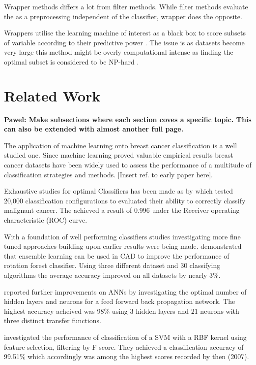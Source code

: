 Wrapper methods differs a lot from filter methods. While filter methods evaluate the as a preprocessing independent of the classifier, wrapper does the opposite.

Wrappers utilise the learning machine of interest as a black box to score subsets of variable according to their predictive power \parencite{guyon2003}. The issue is as datasets become very large this method might be overly computational intense as finding the optimal subset is considered to be NP-hard \parencite{amaldi1998}.


\section{Related Work}

\textbf{ Pawel: Make subsections where each section coves a specific topic. This can also be extended with almost another full page.}

The application of machine learning onto breast cancer classification is a well studied one. Since machine learning proved valuable empirical results breast cancer datasets have been widely used to assess the performance of a multitude of classification strategies and methods. [Insert ref. to early paper here].

Exhaustive studies for optimal Classifiers has been made as by \parencite{ramos2012} which tested 20,000 classification configurations to evaluated their ability to correctly classify malignant cancer. The achieved a result of 0.996 under the Receiver operating characteristic (ROC) curve.

With a foundation of well performing classifiers studies investigating more fine tuned approaches building upon earlier results were being made. \textcite{akin2011} demonstrated that ensemble learning can be used in CAD to improve the performance of rotation forest classifier. Using three different dataset and 30 classifying algorithms the average accuracy improved on all datasets by nearly 3\%.

\textcite{Abdel-Ilah2017} reported further improvements on ANNs by investigating the optimal number of hidden layers and neurons for a feed forward back propagation network. The highest accuracy acheived was 98\% using 3 hidden layers and 21 neurons with three distinct transfer functions.

\textcite{akay2009} investigated the performance of classification of a SVM with a RBF kernel using feature selection, filtering by F-score. They achieved a classification accuracy of 99.51\% which accordingly was among the highest scores recorded by then (2007).

